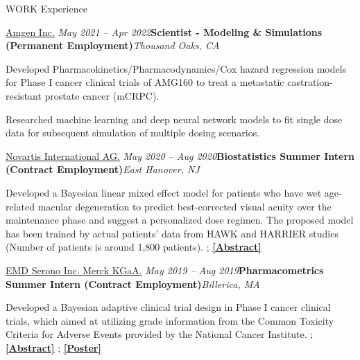 \documentclass[
	11pt, %
]{resume} %
\begin{document}
\begin{rSection}{WORK Experience}
\begin{rSubsection}{
\href{https://www.amgen.com/}{Amgen Inc.}
}{\em May 2021 -- Apr 2022}{\textbf{Scientist - Modeling \& Simulations (Permanent Employment)}}{\em Thousand Oaks, CA}
\item 
Developed Pharmacokinetics/Pharmacodynamics/Cox hazard regression models for Phase I cancer clinical trials of AMG160 to treat a metastatic castration-resistant prostate cancer (mCRPC).
\item 
Researched machine learning and deep neural network models to fit single dose data for subsequent simulation of multiple dosing scenarios. 
\end{rSubsection}

\begin{rSubsection}{
\href{https://www.pharma.us.novartis.com/}{Novartis International AG.}
}{\em May 2020 -- Aug 2020}{\textbf{Biostatistics Summer Intern (Contract Employment)}}{\em East Hanover, NJ}
\item 
Developed a Bayesian linear mixed effect model for patients who have wet age-related macular degeneration to predict best-corrected visual acuity over the maintenance phase and suggest a personalized dose regimen. The proposed model has been trained by actual patients' data from HAWK and HARRIER studies (Number of patients is around 1,800 patients). ; \href{https://sites.google.com/view/seyoonlee/home/projects/novartis-summer-internship-project?authuser=0#h.dfc3zhswkx8m}
{\underline{\textbf{[Abstract]}}}
\end{rSubsection}



\begin{rSubsection}{
\href{https://www.emdserono.com/us-en}{EMD Serono Inc. Merck KGaA.}
}{\em May 2019 -- Aug 2019}{\textbf{Pharmacometrics Summer Intern (Contract Employment)}}{\em Billerica, MA}
\item 
Developed a Bayesian adaptive clinical trial design in Phase I cancer clinical trials, which aimed at utilizing grade information from the Common Toxicity Criteria for Adverse Events provided by the National Cancer Institute. ; 
\href{https://sites.google.com/view/seyoonlee/home/projects/merck-group-summer-internship-project?authuser=0#h.lnkjghpa5ikt}
{\underline{\textbf{[Abstract]}}}
;
\href{https://www.dropbox.com/s/dnlynbzl6ojmgwh/ACOP_Se_Yoon_Lee_PhD.pdf?dl=0}
{\underline{\textbf{[Poster]}}}
\end{rSubsection}



\end{rSection}
\end{document}
